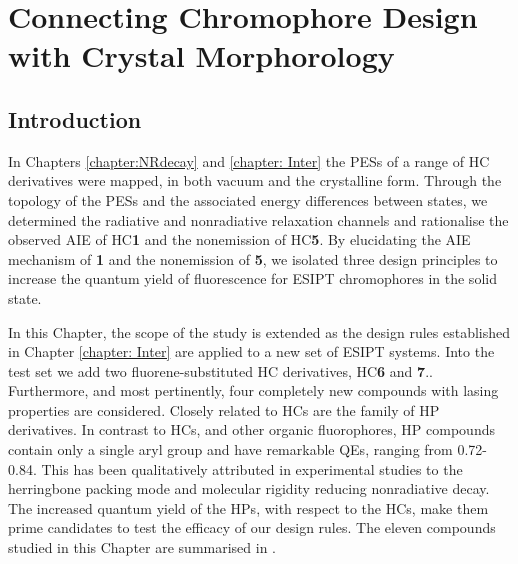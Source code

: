 \chapter[Connecting Chromophore Design with Crystal Morphorology]{Connecting Chromophore Design with Crystal Morphorology}
\label{chapter: Connecting}
\section{Introduction}\label{section: Connecting_Introduction}

In Chapters \ref{chapter:NRdecay} and \ref{chapter: Inter} the \acp{PES} of a range of \ac{HC} derivatives were mapped,  in both vacuum and the crystalline form. Through the topology of the PESs and the associated energy differences between states, we determined the radiative and nonradiative relaxation channels and rationalise the observed \ac{AIE} of \ac{HC}\textbf{1} and the nonemission of \ac{HC}\textbf{5}. By elucidating the AIE mechanism of \textbf{1} and the nonemission of \textbf{5}, we isolated three design principles to increase the quantum yield of fluorescence for ESIPT chromophores in the solid state.

In this Chapter, the scope of the study is extended as the design rules established in Chapter  \ref{chapter: Inter} are applied to a new set of ESIPT systems. Into the test set we add two fluorene-substituted \ac{HC} derivatives, \ac{HC}\textbf{6} and \textbf{7}.\cite{Cheng2016}. Furthermore, and most pertinently, four completely new compounds with lasing properties are considered.  Closely related to \acp{HC} are the family of \ac{HP} derivatives.\cite{Tang2016} In contrast to \acp{HC}, and other organic fluorophores, \ac{HP} compounds contain only a single aryl group and have remarkable QEs, ranging from 0.72-0.84. This has been qualitatively attributed in experimental studies to the herringbone packing mode and molecular rigidity reducing nonradiative decay. The increased quantum yield of the \acp{HP}, with respect to the \acp{HC}, make them prime candidates to test the efficacy of our  design rules. The eleven compounds studied in this Chapter are summarised in \label{table: chalcones}. 


